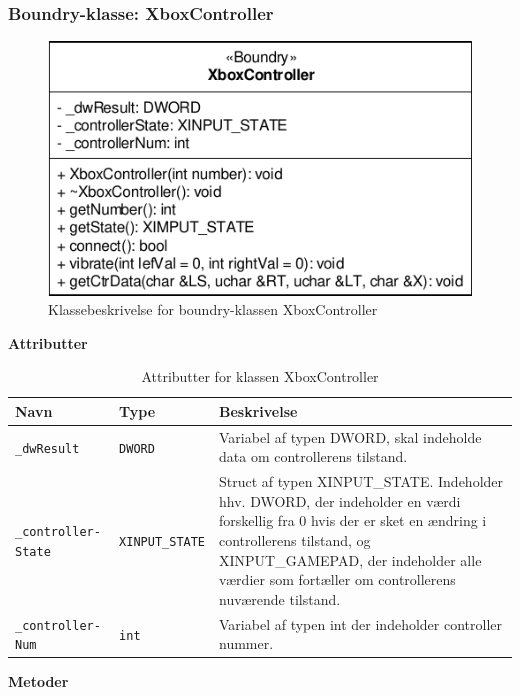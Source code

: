 \subsubsection{Boundry-klasse: XboxController}

\begin{figure}[h]
\centering
\includegraphics[]{../fig/diagrammer/pc/cd_xboxcontroller.pdf}
\caption{Klassebeskrivelse for boundry-klassen XboxController}
\label{fig:cd_data}
\end{figure}

\textbf{Attributter}

\begin{table}[h]
\begin{tabularx}{\textwidth}{| Z | Z | L{10cm} |} \hline
Navn & Type & Beskrivelse \\\hline
\texttt{\_dwResult}				& \texttt{DWORD}		&Variabel af typen DWORD, skal indeholde data om controllerens tilstand.\\\hline

\texttt{\_controller- State}	& \texttt{XINPUT\_STATE}&Struct af typen XINPUT\_STATE. Indeholder hhv. DWORD, der indeholder en værdi forskellig fra 0 hvis der er sket en ændring i controllerens tilstand, og XINPUT\_GAMEPAD, der indeholder alle værdier som fortæller om controllerens nuværende tilstand.\\\hline

\texttt{\_controller- Num}		& \texttt{int}			&Variabel af typen int der indeholder controller nummer.\\\hline
\end{tabularx}
\caption{Attributter for klassen XboxController}
\label{table:attr_xboxcontroller}
\end{table}

\textbf{Metoder}

